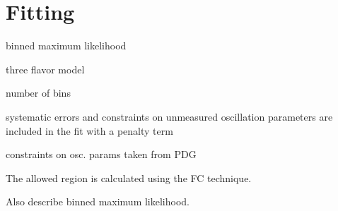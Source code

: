 \section{Fitting}
\label{fitting_section}

binned maximum likelihood

three flavor model

number of bins

systematic errors and constraints on unmeasured oscillation parameters
are included in the fit with a penalty term

constraints on osc. params taken from PDG

The allowed region is calculated using the FC technique.

Also describe binned maximum likelihood.



